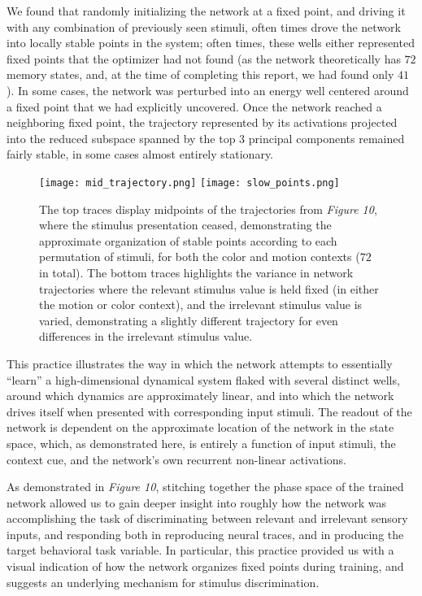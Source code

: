 \documentclass[12pt,a4paper,final]{iopart}
\begin{document}
We found that randomly initializing the network at a fixed point, and driving it with any combination of previously seen stimuli, often times drove the network into locally stable points in the system; often times, these wells either represented fixed points that the optimizer had not found (as the network theoretically has $72$ memory states, and, at the time of completing this report, we had found only $41$). In some cases, the network was perturbed into an energy well centered around a fixed point that we had explicitly uncovered. Once the network reached a neighboring fixed point, the trajectory represented by its activations projected into the reduced subspace spanned by the top $3$ principal components remained fairly stable, in some cases almost entirely stationary.

\begin{figure}
    \centering
    \texttt{[image: mid\_trajectory.png]}
    \texttt{[image: slow\_points.png]}
    \caption{The top traces display midpoints of the trajectories from \emph{Figure 10}, where the stimulus presentation ceased, demonstrating the approximate organization of stable points according to each permutation of stimuli, for both the color and motion contexts ($72$ in total). The bottom traces highlights the variance in network trajectories where the relevant stimulus value is held fixed (in either the motion or color context), and the irrelevant stimulus value is varied, demonstrating a slightly different trajectory for even differences in the irrelevant stimulus value.}
    \label{fig:my_label}
\end{figure}

This practice illustrates the way in which the network attempts to essentially ``learn'' a high-dimensional dynamical system flaked with several distinct wells, around which dynamics are approximately linear, and into which the network drives itself when presented with corresponding input stimuli. The readout of the network is dependent on the approximate location of the network in the state space, which, as demonstrated here, is entirely a function of input stimuli, the context cue, and the network's own recurrent non-linear activations.

As demonstrated in \emph{Figure 10}, stitching together the phase space of the trained network allowed us to gain deeper insight into roughly how the network was accomplishing the task of discriminating between relevant and irrelevant sensory inputs, and responding both in reproducing neural traces, and in producing the target behavioral task variable. In particular, this practice provided us with a visual indication of how the network organizes fixed points during training, and suggests an underlying mechanism for stimulus discrimination.
\end{document}
